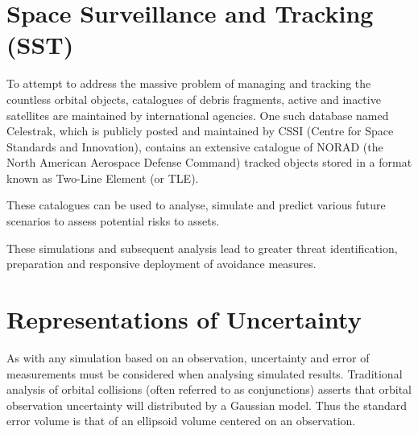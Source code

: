 \documentclass[12pt,openany,a4paper]{book}
\begin{document}
	
	

		\section{Space Surveillance and Tracking (SST)}
		
		To attempt to address the massive problem of managing and tracking the countless orbital objects, catalogues of debris fragments, active and inactive satellites are maintained by international agencies. One such database named Celestrak, which is publicly posted and maintained by CSSI (Centre for Space Standards and Innovation), contains an extensive catalogue of NORAD (the North American Aerospace Defense Command) tracked objects stored in a format known as Two-Line Element (or TLE).  \newline
		
		These catalogues can be used to analyse, simulate and predict various future scenarios to assess potential risks to assets. \newline
		
		These simulations and subsequent analysis lead to greater threat identification, preparation and responsive deployment of avoidance measures. \newline
		

		
		
		\section{Representations of Uncertainty}
		As with any simulation based on an observation, uncertainty and error of measurements must be considered when analysing simulated results. Traditional analysis of orbital collisions (often referred to as conjunctions) asserts that orbital observation uncertainty will distributed by a Gaussian model. Thus the standard error volume is that of an ellipsoid volume centered on an observation. \newline
		
\end{document}
